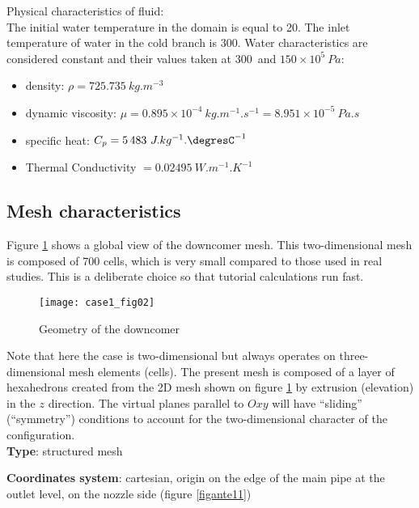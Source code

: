 Physical characteristics of fluid:\\
The initial water temperature in the domain is equal to 20\degresC.
The inlet temperature of water in the cold branch is 300\degresC.
Water characteristics are considered constant and their values taken at
300\degresC\ and $150\times 10^{5}\ Pa$:
\begin{itemize}
        \item density: $\rho = 725.735\ kg.m^{-3}$
        \item dynamic viscosity: $\mu = 0.895\times10^{-4}\ kg.m^{-1}.s^{-1}= 8.951\times10^{-5}\ Pa.s$
        \item specific heat: $C_{p} = 5\,483\ J.kg^{-1}.\mbox{\degresC}^{-1}$
        \item Thermal Conductivity $ = 0.02495\ W.m^{-1}.K^{-1}$
\end{itemize}


        \subsection{Mesh characteristics}

Figure \ref{figante12} shows a global view of the downcomer mesh. This
two-dimensional mesh is composed
of 700 cells, which is very small compared to those used in real
studies. This is
a deliberate choice so that tutorial calculations run fast.

\begin{figure}[h!]
\begin{center}
\texttt{[image: case1\_fig02]}
\caption{Geometry of the downcomer}
\label{figante12}
\end{center}
\end{figure}

Note that here the case is two-dimensional but \CS always operates on three-dimensional
mesh elements (cells). The present mesh is composed of a layer of hexahedrons
created from the 2D mesh shown on figure \ref{figante12} by
extrusion (elevation) in the $z$ direction. The virtual planes
parallel to $Oxy$ will have ``sliding'' (``symmetry'') conditions to account for
the two-dimensional character of the configuration.\\

{\bfseries Type}: structured mesh

{\bfseries Coordinates system}: cartesian, origin on the edge of the main
pipe at the outlet level, on the nozzle side (figure \ref{figante11})

